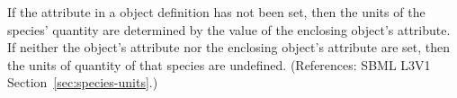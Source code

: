 If the  attribute in a \Species object definition has
not been set, then the units of the species' quantity are determined by the
value of the enclosing \Model object's  attribute.
If neither the \Species object's  attribute nor the
enclosing \Model object's  attribute are set, then
the units of quantity of that species are undefined.  (References: SBML
L3V1 Section~\ref{sec:species-units}.)
